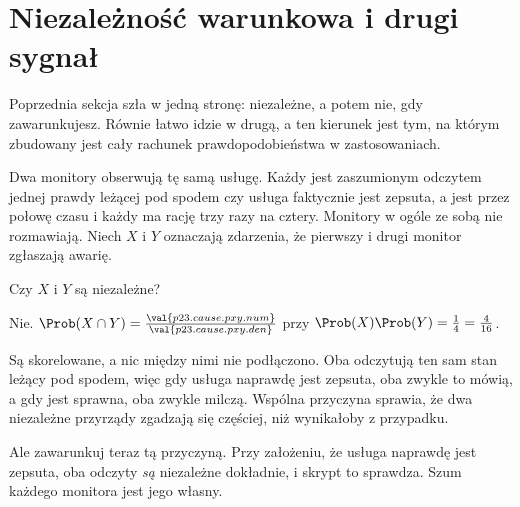 \section{Niezależność warunkowa i drugi sygnał}
\label{sec:P23-conditional}

\begin{fr}
Poprzednia sekcja szła w jedną stronę: niezależne, a potem nie, gdy
zawarunkujesz. Równie łatwo idzie w drugą, a ten kierunek jest tym, na którym
zbudowany jest cały rachunek prawdopodobieństwa w zastosowaniach.

Dwa monitory obserwują tę samą usługę. Każdy jest zaszumionym odczytem jednej
prawdy leżącej pod spodem \dash{} czy usługa faktycznie jest zepsuta, a jest
przez połowę czasu \dash{} i każdy ma rację trzy razy na cztery. Monitory w
ogóle ze sobą nie rozmawiają. Niech $X$ i $Y$ oznaczają zdarzenia, że
pierwszy i drugi monitor zgłaszają awarię.

Czy $X$ i $Y$ są niezależne?
\dotline
\nextframe
\end{fr}

\begin{fr}
\begin{ansblock}
Nie. $\Prob(X \cap Y) = \frac{\val{p23.cause.pxy.num}}{\val{p23.cause.pxy.den}}$
przy $\Prob(X)\Prob(Y) = \frac{1}{4} = \frac{4}{16}$.
\end{ansblock}

Są skorelowane, a nic między nimi nie podłączono. Oba odczytują ten sam stan
leżący pod spodem, więc gdy usługa naprawdę jest zepsuta, oba zwykle to mówią,
a gdy jest sprawna, oba zwykle milczą. Wspólna przyczyna sprawia, że dwa
niezależne przyrządy zgadzają się częściej, niż wynikałoby z przypadku.

Ale zawarunkuj teraz tą przyczyną. Przy założeniu, że usługa naprawdę jest
zepsuta, oba odczyty \emph{są} niezależne \dash{} dokładnie, i skrypt to
sprawdza. Szum każdego monitora jest jego własny.
\end{fr}

